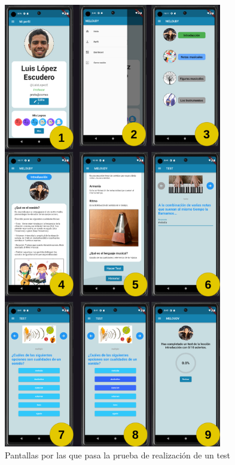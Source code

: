 \begin{figure}[H]
    \centering
    \includegraphics[width=0.85\textwidth]{imagenes/c8/testint3.png}
    \caption{Pantallas por las que pasa la prueba de realización de un test}
    \label{fig:prueba_realizacion_test}
\end{figure}
